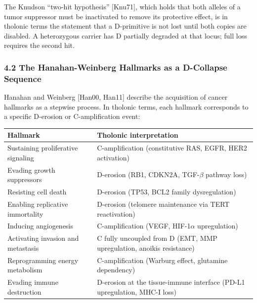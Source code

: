 \documentclass[
  11pt,
  letterpaper,
]{article}
\begin{document}
The Knudson ``two-hit hypothesis'' {[}Knu71{]}, which holds that both
alleles of a tumor suppressor must be inactivated to remove its
protective effect, is in tholonic terms the statement that a D-primitive
is not lost until both copies are disabled. A heterozygous carrier has D
partially degraded at that locus; full loss requires the second hit.

\subsubsection{4.2 The Hanahan-Weinberg Hallmarks as a D-Collapse
Sequence}\label{the-hanahan-weinberg-hallmarks-as-a-d-collapse-sequence}

Hanahan and Weinberg {[}Han00, Han11{]} describe the acquisition of
cancer hallmarks as a stepwise process. In tholonic terms, each hallmark
corresponds to a specific D-erosion or C-amplification event:

\begin{longtable}[]{@{}
  >{\raggedright\arraybackslash}p{}
  >{\raggedright\arraybackslash}p{}@{}}
\toprule\noalign{}
\begin{minipage}[b]{\linewidth}\raggedright
Hallmark
\end{minipage} & \begin{minipage}[b]{\linewidth}\raggedright
Tholonic interpretation
\end{minipage} \\
\midrule\noalign{}
\endhead
\bottomrule\noalign{}
\endlastfoot
Sustaining proliferative signaling & C-amplification (constitutive RAS,
EGFR, HER2 activation) \\
Evading growth suppressors & D-erosion (RB1, CDKN2A, TGF-\(\beta\)
pathway loss) \\
Resisting cell death & D-erosion (TP53, BCL2 family dysregulation) \\
Enabling replicative immortality & D-erosion (telomere maintenance via
TERT reactivation) \\
Inducing angiogenesis & C-amplification (VEGF, HIF-1\(\alpha\)
upregulation) \\
Activating invasion and metastasis & C fully uncoupled from D (EMT, MMP
upregulation, anoikis resistance) \\
Reprogramming energy metabolism & C-amplification (Warburg effect,
glutamine dependency) \\
Evading immune destruction & D-erosion at the tissue-immune interface
(PD-L1 upregulation, MHC-I loss) \\
\end{longtable}
\end{document}

